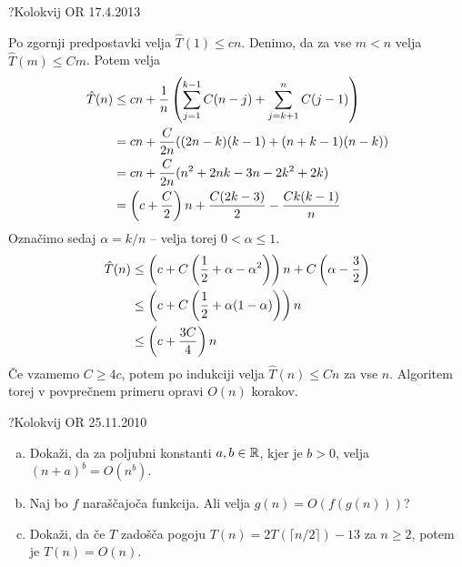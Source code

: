 \begin{naloga}{?}{Kolokvij OR 17.4.2013}
\begin{odgovor}
Po zgornji predpostavki velja $\hat{T}(1) \le cn$.
Denimo, da za vse $m < n$ velja $\hat{T}(m) \le Cm$.
Potem velja
\begin{align*}
\hat{T}(n) &\le cn +
{1 \over n} \left(\sum_{j=1}^{k-1} C(n-j) +
\sum_{j=k+1}^n C(j-1) \right) \\
&= cn + {C \over 2n} ((2n-k)(k-1) + (n+k-1)(n-k)) \\
&= cn + {C \over 2n} (n^2 + 2nk - 3n - 2k^2 + 2k) \\
&= \left(c + {C \over 2}\right) n + {C(2k - 3) \over 2} - {Ck(k-1) \over n}
\end{align*}
Označimo sedaj $\alpha = k/n$ -- velja torej $0 < \alpha \le 1$.
\begin{align*}
\hat{T}(n) &\le
\left(c + C \left({1 \over 2} + \alpha - \alpha^2\right) \right) n
+ C \left(\alpha - {3 \over 2}\right) \\
&\le \left(c + C \left({1 \over 2} + \alpha (1 - \alpha)\right) \right) n \\
&\le \left(c + {3C \over 4} \right) n
\end{align*}
Če vzamemo $C \ge 4c$,
potem po indukciji velja $\hat{T}(n) \le Cn$ za vse $n$.
Algoritem torej v povprečnem primeru opravi $O(n)$ korakov.
\end{odgovor}
\end{naloga}

\begin{naloga}{?}{Kolokvij OR 25.11.2010}
\begin{vprasanje}[onotacija]
\begin{enumerate}[(a)]
\item Dokaži, da za poljubni konstanti $a, b \in \mathbb{R}$, kjer je $b > 0$,
velja ${(n + a)}^b = O(n^b)$.

\item Naj bo $f$ naraščajoča funkcija.
Ali velja $g(n) = O(f(g(n)))$?

\item Dokaži,
da če $T$ zadošča pogoju $T(n) = 2T(\lceil n/2 \rceil) - 13$ za $n \ge 2$,
potem je $T(n) = O(n)$.
\end{enumerate}
\end{vprasanje}
\begin{odgovor}
\end{odgovor}
\end{naloga}


